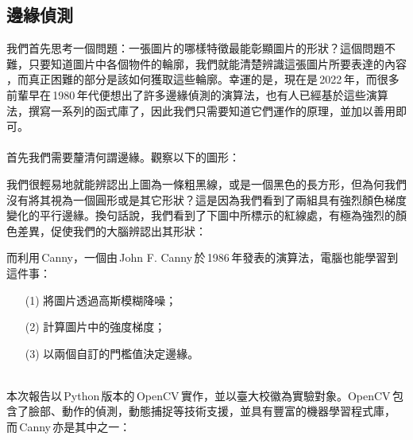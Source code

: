   \subsection{邊緣偵測}
  我們首先思考一個問題：一張圖片的哪樣特徵最能彰顯圖片的形狀？這個問題不難，只要知道圖片中各個物件的輪廓，我們就能清楚辨識這張圖片所要表達的內容
  ，而真正困難的部分是該如何獲取這些輪廓。幸運的是，現在是\,2022\,年，而很多前輩早在\,1980\,年代便想出了許多邊緣偵測的演算法，也有人已經基於這些演算法，撰寫一系列的函式庫了，因此我們只需要知道它們運作的原理，並加以善用即可。
  \\\\
  首先我們需要釐清何謂邊緣。觀察以下的圖形：
  \begin{center}
  \end{center}
  我們很輕易地就能辨認出上圖為一條粗黑線，或是一個黑色的長方形，但為何我們沒有將其視為一個圓形或是其它形狀？這是因為我們看到了兩組具有強烈顏色梯度變化的平行邊緣。換句話說，我們看到了下圖中所標示的紅線處，有極為強烈的顏色差異，促使我們的大腦辨認出其形狀：
  \begin{center}
  \end{center}
  \noindent 而利用\,Canny，一個由\,John F. Canny\,於\,1986\,年發表的演算法，電腦也能學習到這件事：
  \begin{enumerate}
    \item[(1)]
    將圖片透過高斯模糊降噪；

    \item[(2)]
    計算圖片中的強度梯度；

    \item[(3)]
    以兩個自訂的門檻值決定邊緣。
  \end{enumerate}
  \noindent \\
  本次報告以\,Python\,版本的\,OpenCV\,實作，並以臺大校徽為實驗對象。OpenCV\,包含了臉部、動作的偵測，動態捕捉等技術支援，並具有豐富的機器學習程式庫，而\,Canny\,亦是其中之一：
